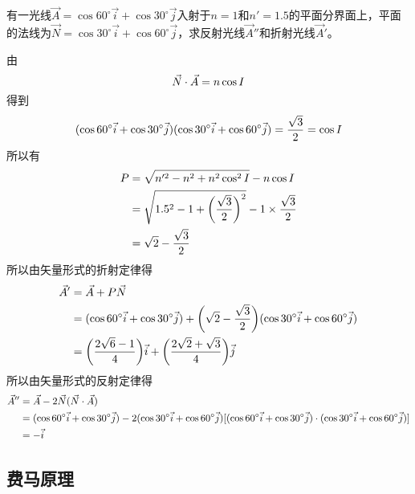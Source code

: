 \begin{problem}
	有一光线$\vec{A}=\cos 60^{\circ}\vec{i}+\cos 30^{\circ}\vec{j}$入射于$n=1$和$n'=1.5$的平面分界面上，平面的法线为$\vec{N}=\cos 30^{\circ}\vec{i}+\cos 60^{\circ}\vec{j}$，求反射光线$\vec{A}''$和折射光线$\vec{A}'$。
\end{problem}
\begin{solution}
	由
	\begin{equation}
	\vec{N}\cdot\vec{A}=n\cos I\notag
	\end{equation}
	得到
	\begin{equation}
	(\cos 60^{\circ}\vec{i}+\cos 30^{\circ}\vec{j})(\cos 30^{\circ}\vec{i}+\cos 60^{\circ}\vec{j})=\frac{\sqrt{3}}{2}=\cos I\notag
	\end{equation}
	所以有
	\begin{equation}
	\begin{aligned}
	P&=\sqrt{n'^2-n^2+n^2\cos^2 I}-n\cos I\\
	&=\sqrt{1.5^2-1+\bigg(\frac{\sqrt{3}}{2}\bigg)^2}-1\times\frac{\sqrt{3}}{2}\\
	&=\sqrt{2}-\frac{\sqrt{3}}{2}\notag
	\end{aligned}
	\end{equation}
	所以由矢量形式的折射定律得
	\begin{equation}
	\begin{aligned}
	\vec{A}'&=\vec{A}+P\vec{N}\\
	&=(\cos 60^{\circ}\vec{i}+\cos 30^{\circ}\vec{j})+\bigg(\sqrt{2}-\frac{\sqrt{3}}{2}\bigg)(\cos 30^{\circ}\vec{i}+\cos 60^{\circ}\vec{j})\\
	&=\bigg(\frac{2\sqrt{6}-1}{4}\bigg)\vec{i}+\bigg(\frac{2\sqrt{2}+\sqrt{3}}{4}\bigg)\vec{j}\notag
	\end{aligned}
	\end{equation}
	所以由矢量形式的反射定律得
	\begin{equation}
	\begin{aligned}
	\vec{A}''&=\vec{A}-2\vec{N}(\vec{N}\cdot\vec{A})\\
	&=(\cos 60^{\circ}\vec{i}+\cos 30^{\circ}\vec{j})-2(\cos 30^{\circ}\vec{i}+\cos 60^{\circ}\vec{j})[(\cos 60^{\circ}\vec{i}+\cos 30^{\circ}\vec{j})\cdot(\cos 30^{\circ}\vec{i}+\cos 60^{\circ}\vec{j})]\\
	&=-\vec{i}\notag
	\end{aligned}
	\end{equation}
\end{solution}

\subsection{费马原理}

